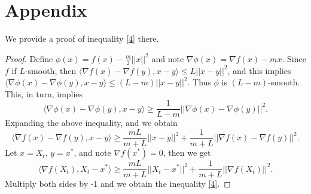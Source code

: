 \documentclass[11pt]{article}
\begin{document}
\section{Appendix}\label{A}
We provide a proof of inequality \eqref{4} there.

\begin{proof}
Define $\phi(x)=f(x)-\frac{m}{2}||x||^2$ and note $\nabla\phi(x)=\nabla f(x)-mx$. Since $f$ if $L$-smooth, then $\langle\nabla f(x)-\nabla f(y),x-y\rangle \leq L||x-y||^2$, and this implies $\langle\nabla\phi(x)-\nabla\phi(y),x-y\rangle \leq (L-m)||x-y||^2$. Thus $\phi$ is $(L-m)$-smooth. This, in turn, implies
\[
\langle\nabla\phi(x)-\nabla\phi(y),x-y\rangle \geq \frac{1}{L-m}||\nabla\phi(x)-\nabla\phi(y)||^2.
\]
Expanding the above inequality, and we obtain
\[
\langle\nabla f(x)-\nabla f(y),x-y\rangle \geq \frac{mL}{m+L}||x-y||^2+\frac{1}{m+L}||\nabla f(x)-\nabla f(y)||^2.
\]
Let $x=X_t$, $y=x^*$, and note $\nabla f(x^*)=0$, then we get
\[
\langle\nabla f(X_t),X_t-x^*\rangle \geq \frac{mL}{m+L}||X_t-x^*||^2+\frac{1}{m+L}||\nabla f(X_t)||^2.
\]
Multiply both sides by -1 and we obtain the inequality \eqref{4}.
\end{proof}
\end{document}
